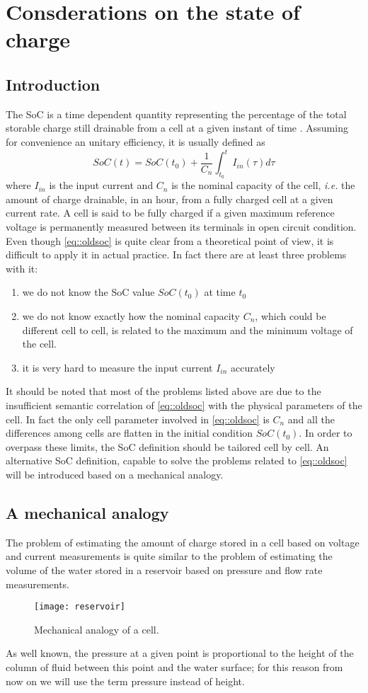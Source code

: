 \documentclass[journal]{IEEEtran}
\begin{document}
\section{Consderations on the state of charge}
\label{sec::soc}
\subsection{Introduction}
The SoC is a time dependent quantity representing the percentage of the total storable charge still drainable from a cell at a given instant of time \cite{Zou_2014}. Assuming for convenience an unitary efficiency, it is usually defined as
\begin{equation}
SoC(t)=SoC(t_0)+\frac{1}{C_n}\int_{t_0}^{t}I_{in}(\tau)d\tau
\label{eq::oldsoc}
\end{equation}
where $I_{in}$ is the input current and $C_n$ is the nominal capacity of the cell, \textit{i.e.} the  amount of charge drainable, in an hour, from a fully charged cell at a given current rate. A cell is said to be fully charged if a given maximum reference voltage is permanently measured between its terminals in open circuit condition.
Even though \eqref{eq::oldsoc} is quite clear from a theoretical point of view, it is difficult to apply it in actual practice. In fact there are at least three problems with it:
\begin{enumerate}
\item we do not know the SoC value $SoC(t_0)$ at time $t_0$
\item we do not know exactly how the nominal capacity $C_n$, which could be different cell to cell, is related to the maximum and the minimum voltage of the cell.
\item it is very hard to measure the input current $I_{in}$ accurately 
\end{enumerate}
It should be noted that most of the problems listed above are due to the insufficient semantic correlation of \eqref{eq::oldsoc} with the physical parameters of the cell. In fact the only cell parameter involved in \eqref{eq::oldsoc} is $C_n$ and all the differences among cells are flatten in the initial condition $SoC(t_0)$.
In order to overpass these limits, the SoC definition should be tailored cell by cell.
An alternative SoC definition, capable to solve the problems related to \eqref{eq::oldsoc} will be introduced based on a mechanical analogy.
\subsection{A mechanical analogy}
\label{sec::analogy}
The problem of estimating the amount of charge stored in a cell based on voltage and current measurements is quite similar to the problem of estimating the volume of the water stored in a reservoir based on pressure and flow rate measurements.
\begin{figure}[!htbp]
	\centering
		\texttt{[image: reservoir]}
	\caption{Mechanical analogy of a cell.}
	\label{fig::reservoir}
\end{figure}
As well known, the pressure at a given point is proportional to the height of the column of fluid between this point and the water surface; for this reason from now on we will use the term pressure instead of height. 
\end{document}
